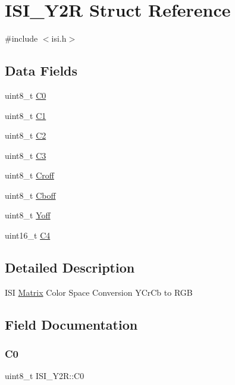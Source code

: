 \hypertarget{structISI__Y2R}{}\section{I\+S\+I\+\_\+\+Y2R Struct Reference}
\label{structISI__Y2R}


{\ttfamily \#include $<$isi.\+h$>$}

\subsection*{Data Fields}
\begin{DoxyCompactItemize}
\item 
uint8\+\_\+t \mbox{\hyperlink{structISI__Y2R_a7886364c024fdc25632b3fa78b49df8a}{C0}}
\item 
uint8\+\_\+t \mbox{\hyperlink{structISI__Y2R_a17e6dc0e7163be249a3f8f2e4dd570d6}{C1}}
\item 
uint8\+\_\+t \mbox{\hyperlink{structISI__Y2R_a0c15dec32ab5e93d73493cdc79997758}{C2}}
\item 
uint8\+\_\+t \mbox{\hyperlink{structISI__Y2R_a91e545507e82f441ecc6074152eb0909}{C3}}
\item 
uint8\+\_\+t \mbox{\hyperlink{structISI__Y2R_afa783ae7148c71923a526faea3078b32}{Croff}}
\item 
uint8\+\_\+t \mbox{\hyperlink{structISI__Y2R_acc9e9d35f3e3e357177bbd495ba808a6}{Cboff}}
\item 
uint8\+\_\+t \mbox{\hyperlink{structISI__Y2R_a79368aeb1f48a134e484914b7d4e109e}{Yoff}}
\item 
uint16\+\_\+t \mbox{\hyperlink{structISI__Y2R_a11cb615669850ffc60dddce576340dc5}{C4}}
\end{DoxyCompactItemize}


\subsection{Detailed Description}
I\+SI \mbox{\hyperlink{structMatrix}{Matrix}} Color Space Conversion Y\+Cr\+Cb to R\+GB 

\subsection{Field Documentation}
\mbox{\label{structISI__Y2R_a7886364c024fdc25632b3fa78b49df8a}} 
\subsubsection{\texorpdfstring{C0}{C0}}
{\footnotesize\ttfamily uint8\+\_\+t I\+S\+I\+\_\+\+Y2\+R\+::\+C0}

